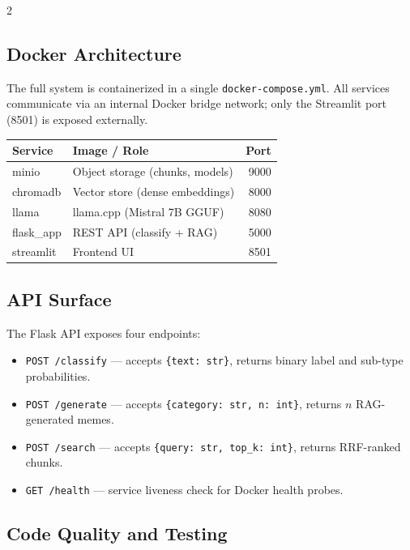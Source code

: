 \documentclass[11pt]{article}
\begin{document}
\begin{multicols}{2}
\subsection{Docker Architecture}

The full system is containerized in a single \texttt{docker-compose.yml}. All services communicate via an internal Docker bridge network; only the Streamlit port (8501) is exposed externally.

\begin{center}
\small
\begin{tabular}{llr}
\toprule
\textbf{Service} & \textbf{Image / Role} & \textbf{Port} \\
\midrule
minio      & Object storage (chunks, models) & 9000 \\
chromadb   & Vector store (dense embeddings) & 8000 \\
llama      & llama.cpp (Mistral 7B GGUF)     & 8080 \\
flask\_app & REST API (classify + RAG)      & 5000 \\
streamlit  & Frontend UI                     & 8501 \\
\bottomrule
\end{tabular}
\end{center}

\subsection{API Surface}

The Flask API exposes four endpoints:

\begin{itemize}
  \item \texttt{POST /classify} — accepts \texttt{\{text: str\}}, returns binary label and sub-type probabilities.
  \item \texttt{POST /generate} — accepts \texttt{\{category: str, n: int\}}, returns $n$ RAG-generated memes.
  \item \texttt{POST /search} — accepts \texttt{\{query: str, top\_k: int\}}, returns RRF-ranked chunks.
  \item \texttt{GET /health} — service liveness check for Docker health probes.
\end{itemize}

\subsection{Code Quality and Testing}


\end{multicols}
\end{document}

